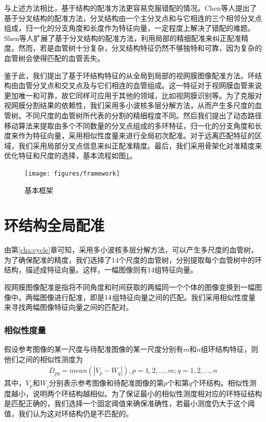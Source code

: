 与上述方法相比，基于结构的配准方法更容易克服错配的情况。Chen\cite{chen2011retinal,chen2015retinal}等人提出了基于分叉结构的配准方法，分叉结构由一个主分叉点和与它相连的三个相邻分叉点组成，归一化的分支角度和长度作为特征向量，一定程度上解决了错配的难题。Shen\cite{shen2012blood}等人扩展了基于分叉结构的配准方法，利用局部的精细配准来纠正配准精度。然而，若是血管树十分复杂，分叉结构特征仍然不够独特和可靠，因为复杂的血管树会使得匹配的血管丢失。

鉴于此，我们提出了基于环结构特征的从全局到局部的视网膜图像配准方法。环结构由血管分叉点和交叉点及与它们相连的血管组成。这一特征对于视网膜血管来说更加唯一和可靠，故它同样可应用于其他的领域，比如视网膜识别等。为了克服对视网膜分割结果的依赖性，我们采用多小波核多层分解方法，从而产生多尺度的血管树。不同尺度的血管树所代表的分割的精细程度不同。然后我们提出了动态路径移动算法来提取由多个不同数量的分叉点组成的多环特征，归一化的分支角度和长度来作为特征向量，采用相似性度量来进行全局初次配准。对于远离匹配特征的区域，我们采用局部分叉点信息来纠正配准精度。最后，我们采用骨架化对准精度来优化特征和尺度的选择，基本流程如图\ref{fig:framework}。
\begin{figure}[!ht]
  \centering
  \texttt{[image: figures/framework]}
  \caption{基本框架}
  \label{fig:framework}
\end{figure}

\section{环结构全局配准}
\label{}
由第\ref{cha:cycle}章可知，采用多小波核多层分解方法，可以产生多尺度的血管树，为了确保配准的精度，我们选择了14个尺度的血管树，分别提取每个血管树中的环结构，描述成特征向量。这样，一幅图像则有14组特征向量。

视网膜图像配准是指将不同角度和时间获取的两幅同一个个体的图像变换到一幅图像中。两幅图像进行配准，即是$14 \time 14$组特征向量之间的匹配。我们采用相似性度量来寻找两幅图像特征向量之间的匹配对。

\subsubsection{相似性度量}
\label{cha:similarity}

假设参考图像的某一尺度与待配准图像的某一尺度分别有$m$和$n$组环结构特征，则他们之间的相似性测度为
\begin{align}
D_{pq} = mean(|V_p-W_q|), p = 1, 2, \ldots, m; q = 1, 2, \ldots, n
\end{align}
其中，$V_p$和$W_j$分别表示参考图像和待配准图像的第$p$个和第$q$个环结构。相似性测度越小，说明两个环结构越相似。为了保证最小的相似性测度相对应的环特征结构是匹配正确的，我们选择一个固定阈值来确保准确性，若最小测度仍大于这个阈值，我们认为这对环结构仍是不匹配的。

